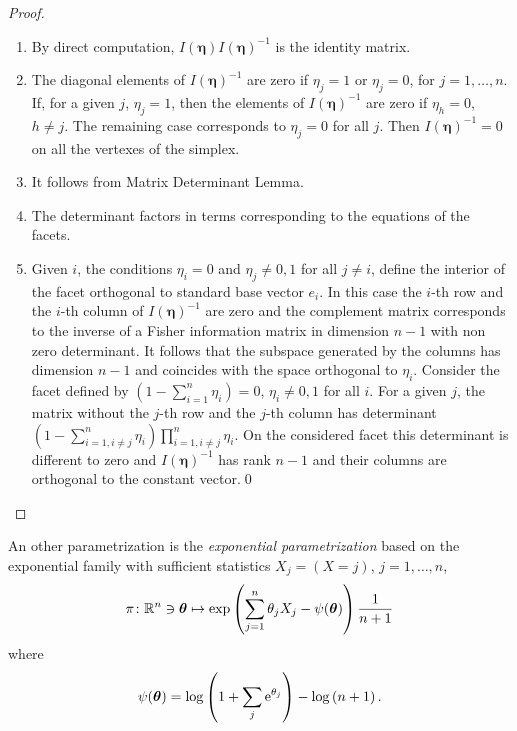 \documentclass[12pt,a4paper]{amsart}
\begin{document}
\begin{proof} \
\begin{enumerate}
\item By direct computation, $I(\bm\eta) I(\bm\eta)^{-1}$ is the identity matrix.

\item The diagonal elements of  $I(\bm\eta)^{-1}$ are zero if $\eta_j=1$ or $\eta_j=0$, for $j=1,\dots,n$. If, for a given $j$,  $\eta_j=1$, then the elements of $I(\bm\eta)^{-1}$ are zero if $\eta_h=0$, $h \ne j$. The remaining case corresponds to  $\eta_j=0$  for all $j$. Then $I(\bm\eta)^{-1}=0$  on all the vertexes of the simplex.

\item It follows from Matrix Determinant Lemma.

\item The determinant factors in terms corresponding to the equations of the facets.
\item
Given $i$, the conditions  $\eta_i=0$ and $\eta_j\ne 0,1$ for all $j\ne i$, define the interior of the facet orthogonal to standard base vector $e_i$. In this case the $i$-th row and the $i$-th column of $ I(\bm\eta)^{-1}$  are zero and  the complement matrix corresponds to the inverse of a Fisher information matrix in dimension $n-1$ with non zero determinant. It follows that the subspace generated by the columns has dimension $n-1$ and coincides with the space orthogonal to $\eta_i$.
Consider  the facet defined by $\left(1- \sum_{i=1}^n \eta_i\right)=0$, $\eta_i\ne 0,1$ for all $i$.  For a given $j$,  the matrix without the $j$-th row and the $j$-th column has determinant
$\left(1-\sum_{i=1,i \ne j }^n \eta_i \right)\prod_{i=1, i \ne j}^n \eta_i$. On the considered facet this determinant is different to zero and $I(\bm\eta)^{-1}$  has rank $n-1$ and their columns are orthogonal to the constant vector.\qed

\end{enumerate}

\end{proof}

An other parametrization is the \emph{exponential parametrization} based on the exponential family with sufficient statistics $X_j = (X=j)$, $j=1,\dots,n$,
%
\begin{equation*}
  \pi \colon \mathbb R^n \ni \bm\theta \mapsto \exp\left(\sum_{j=1}^n \theta_j X_j - \psi(\bm\theta)\right)\frac1{n+1}
\end{equation*}
where
\begin{equation*}
\psi(\bm\theta) = \log\left( 1 + \sum_j \mathrm{e}^{\theta_j} \right) - \log\left( n+1 \right).
\end{equation*}
%
\end{document}

